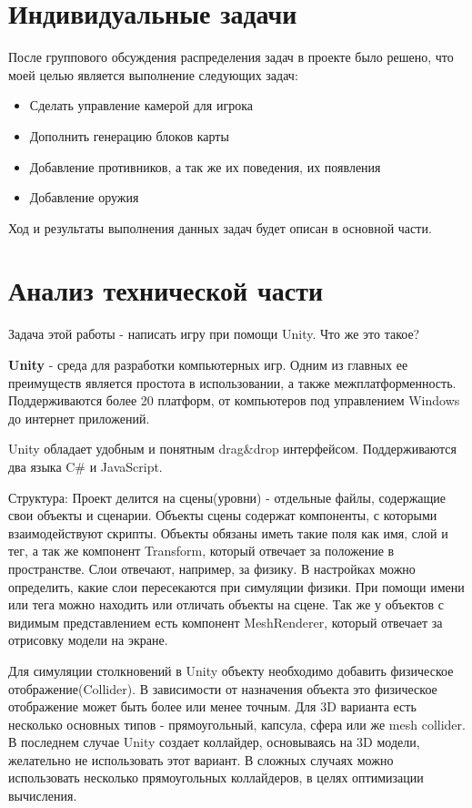 \documentclass[14pt, titlepage,fleqn,a4paper]{extarticle}
\begin{document}
\section*{Индивидуальные задачи}

После группового обсуждения распределения задач в проекте было решено, что моей целью является выполнение следующих задач:

\begin{itemize}
    \item Сделать управление камерой для игрока
	\item Дополнить генерацию блоков карты
	\item Добавление противников, а так же их поведения, их появления
	\item Добавление оружия
\end{itemize}

Ход и результаты выполнения данных задач будет описан в основной части.

	\section*{Анализ технической части}

    Задача этой работы - написать игру при помощи Unity. Что же это такое?

\textbf{Unity} - среда для разработки компьютерных игр. Одним из главных ее преимуществ является простота в использовании, а также межплатформенность. Поддерживаются более 20 платформ, от компьютеров под управлением Windows до интернет приложений.

Unity обладает удобным и понятным drag\&drop интерфейсом. Поддерживаются два языка C\# и JavaScript.

Структура:
	Проект делится на сцены(уровни) - отдельные файлы, содержащие свои объекты и сценарии.
	Объекты сцены содержат компоненты, с которыми взаимодействуют скрипты. Объекты обязаны иметь такие поля как имя, слой и тег, а так же компонент Transform, который отвечает за положение в пространстве. Слои отвечают, например, за физику. В настройках можно определить, какие слои пересекаются при симуляции физики. При помощи имени или тега можно находить или отличать объекты на сцене. Так же у объектов с видимым представлением есть компонент MeshRenderer, который отвечает за отрисовку модели на экране.

	Для симуляции столкновений в Unity объекту необходимо добавить физическое отображение(Collider). В зависимости от назначения объекта это физическое отображение может быть более или менее точным. Для 3D варианта есть несколько основных типов - прямоугольный, капсула, сфера или же mesh collider. В последнем случае Unity  создает коллайдер, основываясь на 3D модели, желательно не использовать этот вариант. В сложных случаях можно использовать несколько прямоугольных коллайдеров, в целях оптимизации вычисления.
\end{document}
